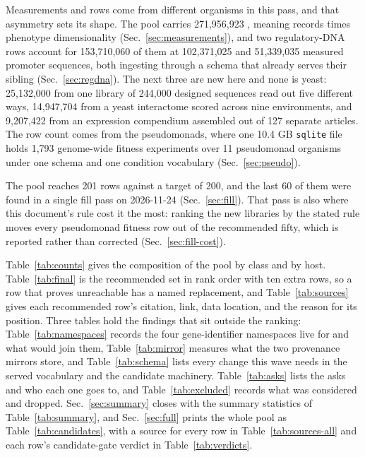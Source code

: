 \documentclass[10pt,a4paper]{article}
\begin{document}
Measurements and rows come from different organisms in this pass, and that asymmetry sets its
shape. The pool carries 271,956,923 , meaning records times phenotype
dimensionality (Sec.~\ref{sec:measurements}), and two  regulatory-DNA rows
account for 153,710,060 of them at 102,371,025 and 51,339,035 measured promoter sequences,
both ingesting through a schema that already serves their sibling (Sec.~\ref{sec:regdna}).
The next three are new here and none is yeast: 25,132,000 from one  library of
244,000 designed sequences read out five different ways, 14,947,704 from a yeast interactome
scored across nine environments, and 9,207,422 from an  expression compendium
assembled out of 127 separate articles. The row count comes from the pseudomonads, where one
10.4 GB \texttt{sqlite} file holds 1,793 genome-wide fitness experiments over 11 pseudomonad
organisms under one schema and one condition vocabulary (Sec.~\ref{sec:pseudo}).

The pool reaches 201 rows against a target of 200, and the last 60 of them were found in a
single fill pass on 2026-11-24 (Sec.~\ref{sec:fill}). That pass is also where this document's
rule cost it the most: ranking the new  libraries by the stated rule moves every
pseudomonad fitness row out of the recommended fifty, which is reported rather than corrected
(Sec.~\ref{sec:fill-cost}).

Table~\ref{tab:counts} gives the composition of the pool by class and by host.
Table~\ref{tab:final} is the recommended set in rank order with ten extra rows, so a row that
proves unreachable has a named replacement, and Table~\ref{tab:sources} gives each recommended
row's citation, link, data location, and the reason for its position. Three tables hold the
findings that sit outside the ranking: Table~\ref{tab:namespaces} records the four
gene-identifier namespaces live for  and what would join them,
Table~\ref{tab:mirror} measures what the two provenance mirrors store, and
Table~\ref{tab:schema} lists every change this wave needs in the served vocabulary and the
candidate machinery. Table~\ref{tab:asks} lists the asks and who each one goes to, and
Table~\ref{tab:excluded} records what was considered and dropped. Sec.~\ref{sec:summary}
closes with the summary statistics of Table~\ref{tab:summary}, and Sec.~\ref{sec:full} prints
the whole pool as Table~\ref{tab:candidates}, with a source for every row in
Table~\ref{tab:sources-all} and each row's candidate-gate verdict in
Table~\ref{tab:verdicts}.

\vspace{0.5em}
\tccontents
\clearpage












\end{document}
